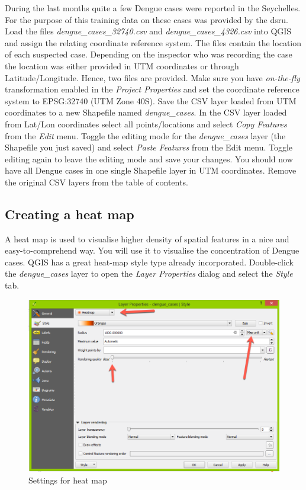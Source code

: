 \documentclass[a4paper,12pt,titlepage]{article}
\begin{document}
During the last months quite a few Dengue cases were reported in the Seychelles. For the purpose of this training data on these cases was provided by the \gls{dsru}. Load the files \textit{dengue\_cases\_32740.csv} and \textit{dengue\_cases\_4326.csv} into QGIS and assign the relating coordinate reference system. The files contain the location of each suspected case. Depending on the inspector who was recording the case the location was either provided in UTM coordinates or through Latitude/Longitude. Hence, two files are provided. Make sure you have \textit{on-the-fly} transformation enabled in the \textit{Project Properties} and set the coordinate reference system to EPSG:32740 (UTM Zone 40S). Save the CSV layer loaded from UTM coordinates to a new Shapefile named \textit{dengue\_cases}. In the CSV layer loaded from Lat/Lon coordinates select all points/locations and select \textit{Copy Features} from the \textit{Edit} menu. Toggle the editing mode for the \textit{dengue\_cases} layer (the Shapefile you just saved) and select \textit{Paste Features} from the Edit menu. Toggle editing again to leave the editing mode and save your changes. You should now have all Dengue cases in one single Shapefile layer in UTM coordinates. Remove the original CSV layers from the table of contents.

\subsection{Creating a heat map}

A heat map is used to visualise higher density of spatial features in a nice and easy-to-comprehend way. You will use it to visualise the concentration of Dengue cases. QGIS has a great heat-map style type already incorporated. Double-click the \textit{dengue\_cases} layer to open the \textit{Layer Properties} dialog and select the \textit{Style} tab. 

\begin{figure}[htb]
	\centering
	\includegraphics[width=12cm]{Images/heat_map_settings.png}
	\caption{Settings for heat map}\label{fig:heat_map_settings}
\end{figure}
\end{document}

